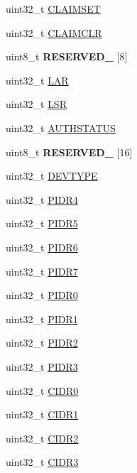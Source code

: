 \begin{DoxyCompactItemize}
\item 
uint32\+\_\+t \hyperlink{struct_e_t_m___mem_map_a410e895c96250842d992c62e914062ab}{C\+L\+A\+I\+M\+S\+E\+T}
\item 
uint32\+\_\+t \hyperlink{struct_e_t_m___mem_map_a7e03dd9e31abcfe824f7b81b3cd4207f}{C\+L\+A\+I\+M\+C\+L\+R}
\item 
\hypertarget{struct_e_t_m___mem_map_ab4c70ebd5d32891b7cc3620c90ced72d}{}uint8\+\_\+t {\bfseries R\+E\+S\+E\+R\+V\+E\+D\+\_} \mbox{[}8\mbox{]}\label{struct_e_t_m___mem_map_ab4c70ebd5d32891b7cc3620c90ced72d}

\item 
uint32\+\_\+t \hyperlink{struct_e_t_m___mem_map_a3e7f9350f82e25fe0112095043733e96}{L\+A\+R}
\item 
uint32\+\_\+t \hyperlink{struct_e_t_m___mem_map_a49d085205e5533bde644d064121739f2}{L\+S\+R}
\item 
uint32\+\_\+t \hyperlink{struct_e_t_m___mem_map_a51a11fd9f2d1c734621098efd2b71493}{A\+U\+T\+H\+S\+T\+A\+T\+U\+S}
\item 
\hypertarget{struct_e_t_m___mem_map_a0313b1038ea8edaeab7145a66296525b}{}uint8\+\_\+t {\bfseries R\+E\+S\+E\+R\+V\+E\+D\+\_} \mbox{[}16\mbox{]}\label{struct_e_t_m___mem_map_a0313b1038ea8edaeab7145a66296525b}

\item 
uint32\+\_\+t \hyperlink{struct_e_t_m___mem_map_a860e1c89b58a257cd4783a2c488360ee}{D\+E\+V\+T\+Y\+P\+E}
\item 
uint32\+\_\+t \hyperlink{struct_e_t_m___mem_map_a5ee81b650eb5614f457473769ea8fb89}{P\+I\+D\+R4}
\item 
uint32\+\_\+t \hyperlink{struct_e_t_m___mem_map_abc897f6c82134908fb148e9283399e7c}{P\+I\+D\+R5}
\item 
uint32\+\_\+t \hyperlink{struct_e_t_m___mem_map_a2c8b019b70ddbec18c4ee65fa670f6f7}{P\+I\+D\+R6}
\item 
uint32\+\_\+t \hyperlink{struct_e_t_m___mem_map_ad50208a539be49c2689ceae20ad53af4}{P\+I\+D\+R7}
\item 
uint32\+\_\+t \hyperlink{struct_e_t_m___mem_map_a8e28324e300b4ce198839c4365ac2c19}{P\+I\+D\+R0}
\item 
uint32\+\_\+t \hyperlink{struct_e_t_m___mem_map_a2b4d5fe9290dc96888a3c8361ff0b1cb}{P\+I\+D\+R1}
\item 
uint32\+\_\+t \hyperlink{struct_e_t_m___mem_map_a60875d0450fd0cc4953bf5551153dc24}{P\+I\+D\+R2}
\item 
uint32\+\_\+t \hyperlink{struct_e_t_m___mem_map_a43bc7f48732725721d1af673497aeb3b}{P\+I\+D\+R3}
\item 
uint32\+\_\+t \hyperlink{struct_e_t_m___mem_map_a289eea9e2103e42ed73809a60b78a83c}{C\+I\+D\+R0}
\item 
uint32\+\_\+t \hyperlink{struct_e_t_m___mem_map_abc79da95babee680c540cbbc4cfa35fe}{C\+I\+D\+R1}
\item 
uint32\+\_\+t \hyperlink{struct_e_t_m___mem_map_ad374b6ac57c02483f0c5a5ad2db6dd5e}{C\+I\+D\+R2}
\item 
uint32\+\_\+t \hyperlink{struct_e_t_m___mem_map_a9c6bb1acae3c766482e230468863dcd6}{C\+I\+D\+R3}
\end{DoxyCompactItemize}


